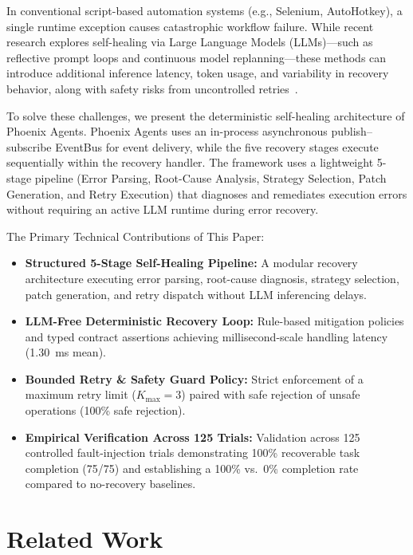 \documentclass[conference]{IEEEtran}
\begin{document}
In conventional script-based automation systems (e.g., Selenium, AutoHotkey), a single runtime exception causes catastrophic workflow failure. While recent research explores self-healing via Large Language Models (LLMs)---such as reflective prompt loops and continuous model replanning---these methods can introduce additional inference latency, token usage, and variability in recovery behavior, along with safety risks from uncontrolled retries~\cite{babu2026,jeong2026}.

To solve these challenges, we present the deterministic self-healing architecture of Phoenix Agents. Phoenix Agents uses an in-process asynchronous publish--subscribe EventBus for event delivery, while the five recovery stages execute sequentially within the recovery handler. The framework uses a lightweight 5-stage pipeline (Error Parsing, Root-Cause Analysis, Strategy Selection, Patch Generation, and Retry Execution) that diagnoses and remediates execution errors without requiring an active LLM runtime during error recovery.

The Primary Technical Contributions of This Paper:
\begin{itemize}
    \item \textbf{Structured 5-Stage Self-Healing Pipeline:} A modular recovery architecture executing error parsing, root-cause diagnosis, strategy selection, patch generation, and retry dispatch without LLM inferencing delays.
    \item \textbf{LLM-Free Deterministic Recovery Loop:} Rule-based mitigation policies and typed contract assertions achieving millisecond-scale handling latency (1.30~ms mean).
    \item \textbf{Bounded Retry \& Safety Guard Policy:} Strict enforcement of a maximum retry limit ($K_{\text{max}} = 3$) paired with safe rejection of unsafe operations (100\% safe rejection).
    \item \textbf{Empirical Verification Across 125 Trials:} Validation across 125 controlled fault-injection trials demonstrating 100\% recoverable task completion (75/75) and establishing a 100\% vs.\ 0\% completion rate compared to no-recovery baselines.
\end{itemize}

\section{Related Work}
\end{document}
